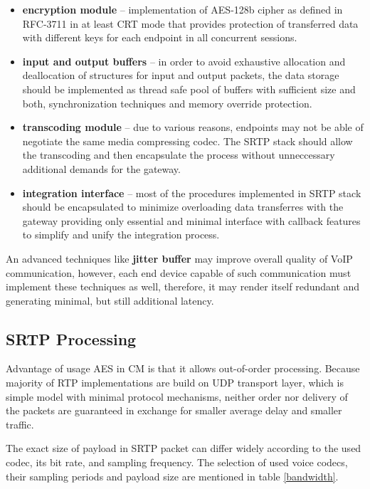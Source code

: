 \begin{itemize}
\item \textbf{encryption module} -- implementation of AES-128b cipher as defined
in RFC-3711 \cite{rfc3711} in at least CRT mode that provides protection of transferred
data with different keys for each endpoint in all concurrent sessions.
\item \textbf{input and output buffers} -- in order to avoid exhaustive allocation
and deallocation of structures for input and output packets, the data storage should
be implemented as thread safe pool of buffers  with sufficient size and both, 
synchronization techniques and memory override protection.
\item \textbf{transcoding module} -- due to various reasons, endpoints may not be
able of negotiate the same media compressing codec. The SRTP stack should allow
the transcoding and then encapsulate the process without unneccessary additional
demands for the gateway.
\item \textbf{integration interface} -- most of the procedures implemented in
SRTP stack should be encapsulated to minimize overloading data transferres with
the gateway providing only essential and minimal interface with callback
features to simplify and unify the integration process.
\end{itemize}

An advanced techniques like \textbf{jitter buffer} may improve overall quality
of VoIP communication, however, each end device capable of such communication must
implement these techniques as well, therefore, it may render itself redundant 
and generating minimal, but still additional latency.

\subsection{SRTP Processing}
Advantage of usage AES in CM is that it allows out-of-order processing. Because
majority of RTP implementations are build on UDP transport layer, which is 
simple model with minimal protocol mechanisms, neither order nor delivery of the
packets are guaranteed in exchange for smaller average delay and smaller 
traffic. 

The exact size of payload in SRTP packet can differ widely according to the 
used codec, its bit rate, and sampling frequency. The selection of used voice
codecs, their sampling periods and payload size are mentioned in table 
\ref{bandwidth}.

